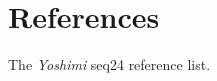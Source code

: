 %
%
%

\section{References}
\label{sec:seq64_references}

   The \textsl{Yoshimi} seq24 reference list.

